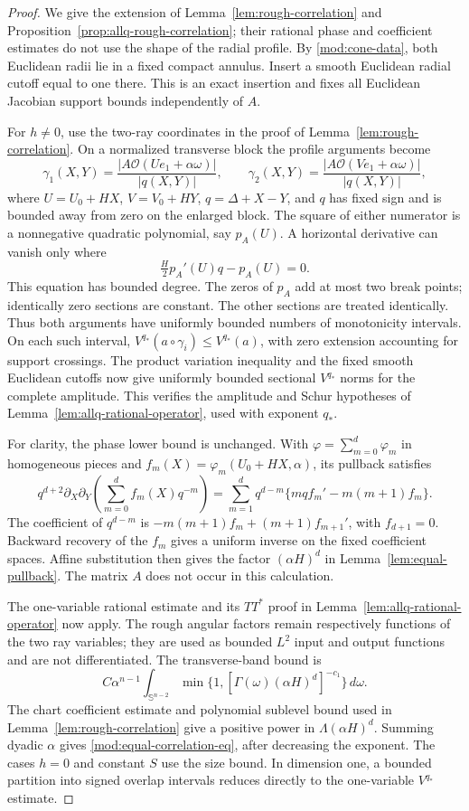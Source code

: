 \documentclass[11pt]{article}
\numberwithin{equation}{section}
\theoremstyle{remark}
\theoremstyle{definition}
\newcommand{\Sph}{\mathbb S}
\begin{document}
\begin{proof}
We give the extension of Lemma~\ref{lem:rough-correlation} and
Proposition~\ref{prop:allq-rough-correlation}; their rational phase and
coefficient estimates do not use the shape of the radial profile.
By \eqref{mod:cone-data}, both Euclidean radii lie in a fixed compact
annulus. Insert a smooth Euclidean radial cutoff equal to one there.
This is an exact insertion and fixes all Euclidean Jacobian support
bounds independently of $A$.

For $h\ne0$, use the two-ray coordinates in the proof of
Lemma~\ref{lem:rough-correlation}. On a normalized transverse block the
profile arguments become
\[
 \gamma_1(X,Y)=\frac{|A\mathcal O(Ue_1+\alpha\omega)|}{|q(X,Y)|},
 \qquad
 \gamma_2(X,Y)=\frac{|A\mathcal O(Ve_1+\alpha\omega)|}{|q(X,Y)|},
\]
where $U=U_0+HX$, $V=V_0+HY$, $q=\Delta+X-Y$, and $q$ has fixed sign and
is bounded away from zero on the enlarged block. The square of either
numerator is a nonnegative quadratic polynomial, say $p_A(U)$. A
horizontal derivative can vanish only where
\[
 \tfrac H2p_A'(U)q-p_A(U)=0.
\]
This equation has bounded degree. The zeros of $p_A$ add at most two
break points; identically zero sections are constant. The other sections
are treated identically. Thus both arguments have uniformly bounded
numbers of monotonicity intervals. On each such interval,
$V^{q_*}(a\circ\gamma_i)\le V^{q_*}(a)$, with zero extension accounting for support
crossings. The product variation inequality and the fixed smooth Euclidean
cutoffs now give uniformly bounded sectional $V^{q_*}$ norms for the
complete amplitude. This verifies the amplitude and Schur hypotheses
of Lemma~\ref{lem:allq-rational-operator}, used with exponent $q_*$.

For clarity, the phase lower bound is unchanged. With
$\varphi=\sum_{m=0}^d\varphi_m$ in homogeneous pieces and
$f_m(X)=\varphi_m(U_0+HX,\alpha)$, its pullback satisfies
\[
 q^{d+2}\partial_X\partial_Y
 \left(\sum_{m=0}^df_m(X)q^{-m}\right)
 =\sum_{m=1}^dq^{d-m}\{mqf_m'-m(m+1)f_m\}.
\]
The coefficient of $q^{d-m}$ is
$-m(m+1)f_m+(m+1)f_{m+1}'$, with $f_{d+1}=0$. Backward recovery of the
$f_m$ gives a uniform inverse on the fixed coefficient spaces. Affine
substitution then gives the factor $(\alpha H)^d$ in
Lemma~\ref{lem:equal-pullback}. The matrix $A$ does not occur in this
calculation.

The one-variable rational estimate and its $TT^*$ proof in
Lemma~\ref{lem:allq-rational-operator} now apply. The rough angular factors
remain respectively functions of the two ray variables; they are used as
bounded $L^2$ input and output functions and are not differentiated.
The transverse-band bound is
\[
 C\alpha^{n-1}\int_{\Sph^{n-2}}
 \min\{1,[\Gamma(\omega)(\alpha H)^d]^{-c_1}\}\,d\omega.
\]
The chart coefficient estimate and polynomial sublevel bound used in
Lemma~\ref{lem:rough-correlation} give a positive power in
$\Lambda(\alpha H)^d$. Summing dyadic $\alpha$ gives
\eqref{mod:equal-correlation-eq}, after decreasing the exponent.
The cases $h=0$ and constant $S$ use the size bound. In dimension one,
a bounded partition into signed overlap intervals reduces directly to
the one-variable $V^{q_*}$ estimate.
\end{proof}
\end{document}

